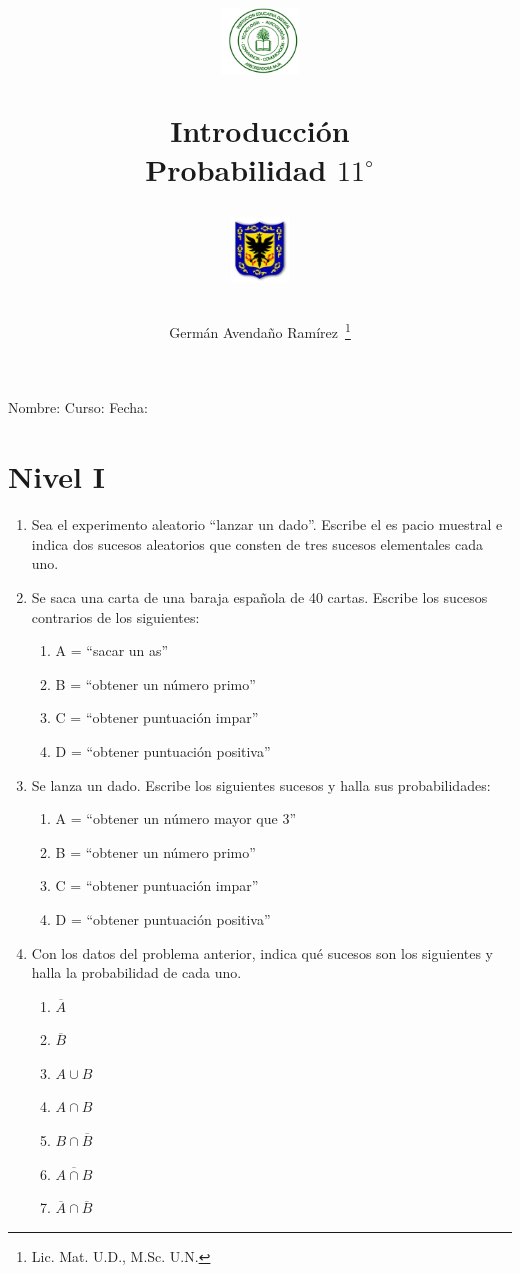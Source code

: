 \documentclass[twoside]{article}
\author{Germ\'an Avenda\~no Ram\'irez~\thanks{Lic. Mat. U.D., M.Sc. U.N.}}
\title{\begin{minipage}{.2\textwidth}
\includegraphics[height=1.75cm]{Images/logo-colegio.png}\end{minipage}
\begin{minipage}{.55\textwidth}
\begin{center}
Introducción\\
Probabilidad $11^{\circ}$
\end{center}
\end{minipage}\hfill
\begin{minipage}{.2\textwidth}
\includegraphics[height=1.75cm]{Images/logo-sed.png} 
\end{minipage}}
\date{}
\begin{document}
\maketitle
Nombre: \hrulefill Curso: \underline{\hspace*{44pt}} Fecha: \underline{\hspace*{2.5cm}}
\section{Nivel I}
\begin{enumerate}
  \item Sea el experimento aleatorio “lanzar un dado”. Escribe el es pacio muestral e indica dos sucesos aleatorios que consten
de tres sucesos elementales cada uno.
\item Se saca una carta de una baraja española de 40 cartas. Escribe los sucesos contrarios de los siguientes:
\begin{enumerate}
  \item A = “sacar un as”
  \item B = “obtener un número primo”
  \item C = “obtener puntuación impar”
  \item D = “obtener puntuación positiva”
\end{enumerate}
\item Se lanza un dado. Escribe los siguientes sucesos y halla sus probabilidades:
\begin{enumerate}
  \item A = “obtener un número mayor que 3”
  \item B = “obtener un número primo”
  \item C = “obtener puntuación impar”
  \item D = “obtener puntuación positiva”
\end{enumerate}
\item Con los datos del problema anterior, indica qué sucesos son
los siguientes y halla la probabilidad de cada uno.
\begin{multicols}{3}
  \begin{enumerate}
    \item $ \overline{A} $
    \item $ \overline{B} $
    \item $ A\cup B $
    \item $ A\cap B $
    \item $ B\cap \overline{B} $
    \item $ \overline{A\cap B} $
    \item $ \overline{A}\cap \overline{B} $

\end{enumerate}
\end{multicols}
\end{enumerate}
\end{document}
